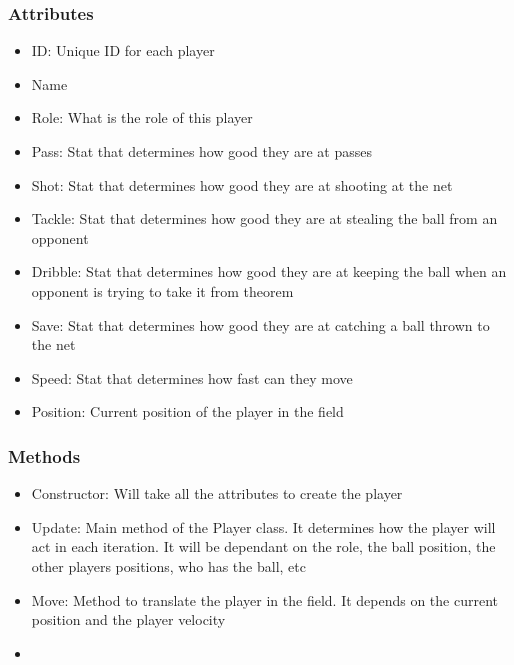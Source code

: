 \documentclass{article}
\theoremstyle{mytheoremstyle}
\theoremstyle{mytheoremstyle}
\theoremstyle{myproblemstyle}
\begin{document}
    \subsubsection{Attributes}
    \begin{itemize}
        \item ID: Unique ID for each player
        \item Name
        \item Role: What is the role of this player
        \item Pass: Stat that determines how good they are at passes
        \item Shot: Stat that determines how good they are at shooting at the net
        \item Tackle: Stat that determines how good they are at stealing the ball from an opponent
        \item Dribble: Stat that determines how good they are at keeping the ball when an opponent is trying to take it from theorem
        \item Save: Stat that determines how good they are at catching a ball thrown to the net
        \item Speed: Stat that determines how fast can they move
        \item Position: Current position of the player in the field
    \end{itemize}

    \subsubsection{Methods}
    \begin{itemize}
        \item Constructor: Will take all the attributes to create the player
        \item Update: Main method of the Player class. It determines how the player will act in each iteration. It will be dependant on the role, the ball position, the other players positions, who has the ball, etc
        \item Move: Method to translate the player in the field. It depends on the current position and the player velocity
        \item 
    \end{itemize}
\end{document}
